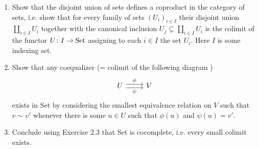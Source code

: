 \begin{Exercise}
    \begin{enumerate}[label=(\alph*)]
        \item 
        Show that the disjoint union of sets defines a coproduct in the category of sets, i.e. show that for every family of sets $ ( U_i )_{ i \in I } $ their disjoint union $\coprod_{ i \in I } U_i $ together with the canonical inclusion $ U_j \subseteq \coprod_{ i \in I } U_i $ is the colimit of the functor $ U \colon I \to \operatorname{Set} $ assigning to each $ i \in I $ the set $ U_i $.
        Here $ I $ is some indexing set.
    
        \item 
        Show that any coequalizer (= colimit of the following diagram ) 
        \[
        \begin{tikzcd}
            U 
            \ar[r, shift left, " \phi "]
            \ar[r, shift right, " \psi "']
            & 
            V
        \end{tikzcd}
        \]
        exists in Set by considering the smallest equivalence relation on $ V $ such that $ v \sim v' $ whenever there is some $ u \in U $ such that $ \phi ( u ) $ and $ \psi ( u ) = v' $.
    
        \item 
        Conclude using Exercise 2.3 that Set is cocomplete, i.e. every small colimit exists.
    \end{enumerate}
\end{Exercise}